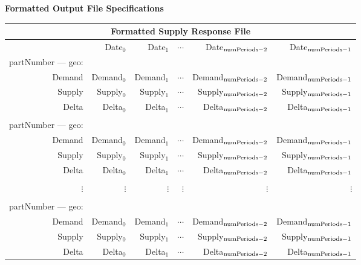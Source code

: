\clearpage
\noindent
{\bf Formatted Output File Specifications}

\vspace{.5in}

\begin{tabular}{rrrrrr}
\multicolumn{6}{c}{{\bf Formatted Supply Response File}}\\ \hline\hline
  & Date$_0$ & Date$_1$ & $\cdots$ & Date$_{{\rm numPeriods} - 2}$ 
             & Date$_{{\rm numPeriods} - 1}$ \\
partNumber --- geo: \\
Demand & Demand$_0$ & Demand$_1$ & $\cdots$ & Demand$_{{\rm numPeriods} - 2}$ 
             & Demand$_{{\rm numPeriods} - 1}$ \\
Supply & Supply$_0$ & Supply$_1$ & $\cdots$ & Supply$_{{\rm numPeriods} - 2}$ 
             & Supply$_{{\rm numPeriods} - 1}$ \\
Delta & Delta$_0$ & Delta$_1$ & $\cdots$ & Delta$_{{\rm numPeriods} - 2}$ 
             & Delta$_{{\rm numPeriods} - 1}$ \\
\\
partNumber --- geo: \\
Demand & Demand$_0$ & Demand$_1$ & $\cdots$ & Demand$_{{\rm numPeriods} - 2}$ 
             & Demand$_{{\rm numPeriods} - 1}$ \\
Supply & Supply$_0$ & Supply$_1$ & $\cdots$ & Supply$_{{\rm numPeriods} - 2}$ 
             & Supply$_{{\rm numPeriods} - 1}$ \\
Delta & Delta$_0$ & Delta$_1$ & $\cdots$ & Delta$_{{\rm numPeriods} - 2}$ 
             & Delta$_{{\rm numPeriods} - 1}$ \\
\\
$\vdots $ & $\vdots $ & $\vdots $ & $\vdots $ & $\vdots $ & $\vdots $ \\
\\
partNumber --- geo: \\
Demand & Demand$_0$ & Demand$_1$ & $\cdots$ & Demand$_{{\rm numPeriods} - 2}$ 
             & Demand$_{{\rm numPeriods} - 1}$ \\
Supply & Supply$_0$ & Supply$_1$ & $\cdots$ & Supply$_{{\rm numPeriods} - 2}$ 
             & Supply$_{{\rm numPeriods} - 1}$ \\
Delta & Delta$_0$ & Delta$_1$ & $\cdots$ & Delta$_{{\rm numPeriods} - 2}$ 
             & Delta$_{{\rm numPeriods} - 1}$ 
\end{tabular}


